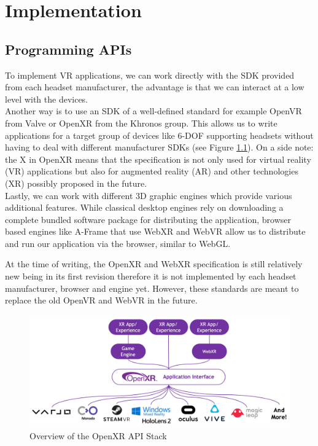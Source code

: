 \chapter{Implementation}
\label{chap:Impl}
\section{Programming APIs}

To implement VR applications, we can work directly with the SDK provided from each headset manufacturer, the advantage is that we can interact at a low level with the devices.\\ 
Another way is to use an SDK of a well-defined standard for example OpenVR from Valve or OpenXR from the Khronos group. This allows us to write applications for a target group of devices like 6-DOF supporting headsets without having to deal with different manufacturer SDKs (see Figure \ref{fig:openxr-overview}). On a side note: the X in OpenXR means that the specification is not only used for virtual reality (VR) applications but also for augmented reality (AR) and other technologies (XR) possibly proposed in the future.\\
Lastly, we can work with different 3D graphic engines which provide various additional features. While classical desktop engines rely on downloading a complete bundled software package for distributing the application, browser based engines like A-Frame that use WebXR and WebVR allow us to distribute and run our application via the browser, similar to WebGL.

At the time of writing, the OpenXR and WebXR specification is still relatively new being in its first revision therefore it is not implemented by each headset manufacturer, browser and engine yet. However, these standards are meant to replace the old OpenVR and WebVR in the future.

\begin{figure}[!hbt]
    \centering
    \includegraphics[width=\textwidth]{graphics/openXR-overview.jpg}
    \caption{Overview of the OpenXR API Stack \cite{khronosGroupOpenXR}}
    \label{fig:openxr-overview}
\end{figure}

